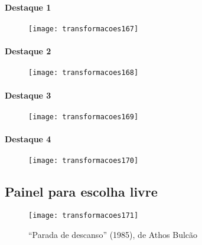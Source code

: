 \begin{multicols}{2}
\paragraph{Destaque 1}

\begin{figure}[H]
\centering

\texttt{[image: transformacoes167]}
\end{figure}
\columnbreak
\paragraph{Destaque 2}

\begin{figure}[H]
\centering

\texttt{[image: transformacoes168]}
\end{figure}
\end{multicols}
\begin{multicols}{2}
\paragraph{Destaque 3}

\begin{figure}[H]
\centering

\texttt{[image: transformacoes169]}
\end{figure}
\columnbreak
\paragraph{Destaque 4}

\begin{figure}[H]
\centering

\texttt{[image: transformacoes170]}
\end{figure}
\end{multicols}


\subsection{Painel para escolha livre}
\begin{figure}[H]
\centering

\texttt{[image: transformacoes171]}
\caption{``Parada de descanso'' (1985), de Athos Bulcão}
\end{figure}


